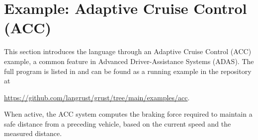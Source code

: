 \section{Example: Adaptive Cruise Control (ACC)}
\label{sec:grust:example}

This section introduces the \GRust language through an Adaptive Cruise Control (ACC) example, a
common feature in Advanced Driver-Assistance Systems (ADAS). The full program is listed in
 and can be found as a running example in the \GRust repository at
\begin{center}
  \url{https://github.com/langrust/grust/tree/main/examples/acc}.
\end{center} When active, the ACC system computes
the braking force required to maintain a safe distance from a preceding vehicle, based on the
current speed and the measured distance.

